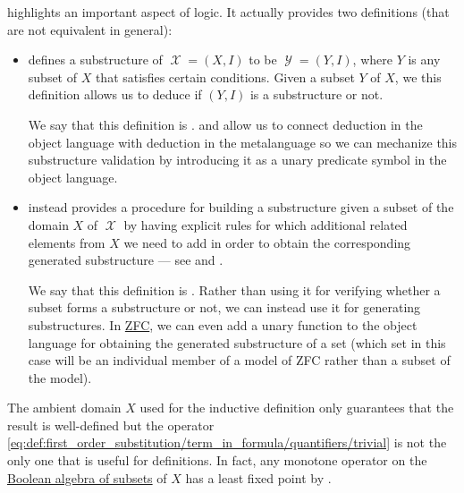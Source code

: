 \begin{remark}\label{rem:induction}
   highlights an important aspect of logic. It actually provides two definitions (that are not equivalent in general):
  \begin{itemize}
    \item {} defines a substructure of \( \mscrX = (X, I) \) to be \( \mscrY = (Y, I) \), where \( Y \) is any subset of \( X \) that satisfies certain conditions. Given a subset \( Y \) of \( X \), we this definition allows us to deduce if \( (Y, I) \) is a substructure or not.

    We say that this definition is .  and  allow us to connect deduction in the object language with deduction in the metalanguage so we can mechanize this substructure validation by introducing it as a unary predicate symbol in the object language.

    \item {} instead provides a procedure for building a substructure given a subset of the domain \( X \) of \( \mscrX \) by having explicit rules for which additional related elements from \( X \) we need to add in order to obtain the corresponding generated substructure --- see  and .

    We say that this definition is . Rather than using it for verifying whether a subset forms a substructure or not, we can instead use it for generating substructures. In \hyperref[def:zfc]{ZFC}, we can even add a unary function to the object language for obtaining the generated substructure of a set (which set in this case will be an individual member of a model of ZFC rather than a subset of the model).
  \end{itemize}

  The ambient domain \( X \) used for the inductive definition only guarantees that the result is well-defined but the operator \eqref{eq:def:first_order_substitution/term_in_formula/quantifiers/trivial} is not the only one that is useful for definitions. In fact, any monotone operator on the \hyperref[thm:boolean_algebra_of_subsets]{Boolean algebra of subsets} of \( X \) has a least fixed point by .


\end{remark}
